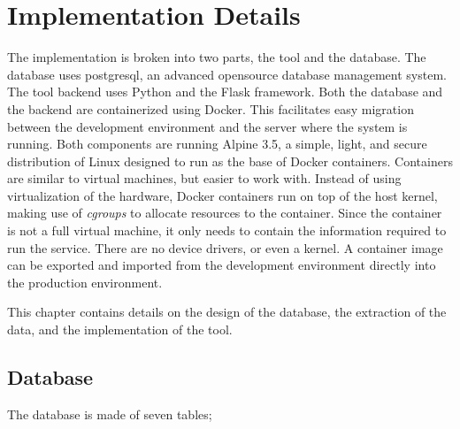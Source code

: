 \chapter{Implementation Details}

The implementation is broken into two parts, the tool and the database.
The database uses postgresql, an advanced opensource database management
system. The tool backend uses Python and the Flask framework.
Both the database and the \tool{} backend are containerized using
Docker. This facilitates easy migration between the development
environment and the server where the system is running. Both components
are running Alpine 3.5, a simple, light, and secure distribution of
Linux designed to run as the base of Docker containers. Containers are
similar to virtual machines, but easier to work with. Instead of using
virtualization of the hardware, Docker containers run on top of the host
kernel, making use of \textit{cgroups} to allocate resources to the
container. Since the container is not a full virtual machine, it only
needs to contain the information required to run the service. There are
no device drivers, or even a kernel. A container image can be exported
and imported from the development environment directly into the
production environment.

This chapter contains details on the design of the database, the
extraction of the data, and the implementation of the tool.

\section{Database}\label{sec:database}

The database is made of seven tables;

